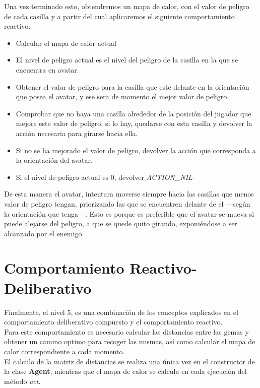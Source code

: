 Una vez terminado esto, obtendremos un mapa de calor, con el valor de peligro de cada casilla y a partir del cual aplicaremos el siguiente comportamiento reactivo:
\begin{itemize}
   \item Calcular el mapa de calor actual
   \item El nivel de peligro actual es el nivel del peligro de la casilla en la que se encuentra en avatar.
   \item Obtener el valor de peligro para la casilla que este delante en la orientación que posea el avatar, y ese sera de momento el mejor valor de peligro.
   \item Comprobar que no haya una casilla alrededor de la posición del jugador que mejore este valor de peligro, si lo hay, quedarse con esta casilla y devolver la acción necesaria para girarse hacia ella.
   \item Si no se ha mejorado el valor de peligro, devolver la acción que corresponda a la orientación del avatar.
   \item Si el nivel de peligro actual es 0, devolver \emph{ACTION\_NIL}
\end{itemize}

De esta manera el avatar, intentara moverse siempre hacia las casillas que menos valor de peligro tengan, priorizando las que se encuentren delante de el ---según la orientación que tenga---. Esto es porque es preferible que el avatar se mueva si puede alejarse del peligro, a que se quede quito girando, exponiéndose a ser alcanzado por el enemigo.

\newpage
\chapter{Comportamiento Reactivo-Deliberativo}

Finalmente, el nivel 5, es una combinación de los conceptos explicados en el comportamiento deliberativo compuesto y el comportamiento reactivo.\\

Para este comportamiento es necesario calcular las distancias entre las gemas y obtener un camino optimo para recoger las mismas, así como calcular el mapa de calor correspondiente a cada momento.\\

El calculo de la matriz de distancias se realiza una única vez en el constructor de la clase \textbf{Agent}, mientras que el mapa de calor se calcula en cada ejecución del método \emph{act}.\\

